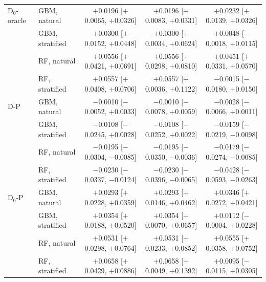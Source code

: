 \begin{longtable}{llccc}
\addlinespace
D$_0$-oracle & GBM, natural & $+$0.0196 [$+$0.0065, $+$0.0326] & $+$0.0196 [$+$0.0083, $+$0.0331] & $+$0.0232 [$+$0.0139, $+$0.0326] \\
 & GBM, stratified & $+$0.0300 [$+$0.0152, $+$0.0448] & $+$0.0300 [$+$0.0034, $+$0.0624] & $+$0.0048 [$-$0.0018, $+$0.0115] \\
 & RF, natural & $+$0.0556 [$+$0.0421, $+$0.0691] & $+$0.0556 [$+$0.0298, $+$0.0810] & $+$0.0451 [$+$0.0331, $+$0.0570] \\
 & RF, stratified & $+$0.0557 [$+$0.0408, $+$0.0706] & $+$0.0557 [$+$0.0036, $+$0.1122] & $-$0.0015 [$-$0.0180, $+$0.0150] \\
\addlinespace
D-P & GBM, natural & $-$0.0010 [$-$0.0052, $+$0.0033] & $-$0.0010 [$-$0.0078, $+$0.0059] & $-$0.0028 [$-$0.0066, $+$0.0011] \\
 & GBM, stratified & $-$0.0108 [$-$0.0245, $+$0.0028] & $-$0.0108 [$-$0.0252, $+$0.0022] & $-$0.0159 [$-$0.0219, $-$0.0098] \\
 & RF, natural & $-$0.0195 [$-$0.0304, $-$0.0085] & $-$0.0195 [$-$0.0350, $-$0.0036] & $-$0.0179 [$-$0.0274, $-$0.0085] \\
 & RF, stratified & $-$0.0230 [$-$0.0337, $-$0.0124] & $-$0.0230 [$-$0.0396, $-$0.0065] & $-$0.0428 [$-$0.0593, $-$0.0263] \\
\addlinespace
D$_0$-P & GBM, natural & $+$0.0293 [$+$0.0228, $+$0.0359] & $+$0.0293 [$+$0.0146, $+$0.0462] & $+$0.0346 [$+$0.0272, $+$0.0421] \\
 & GBM, stratified & $+$0.0354 [$+$0.0188, $+$0.0520] & $+$0.0354 [$+$0.0070, $+$0.0657] & $+$0.0112 [$-$0.0004, $+$0.0228] \\
 & RF, natural & $+$0.0531 [$+$0.0298, $+$0.0764] & $+$0.0531 [$+$0.0233, $+$0.0852] & $+$0.0555 [$+$0.0358, $+$0.0752] \\
 & RF, stratified & $+$0.0658 [$+$0.0429, $+$0.0886] & $+$0.0658 [$+$0.0049, $+$0.1392] & $+$0.0095 [$-$0.0115, $+$0.0305] \\
\bottomrule
\end{longtable}

